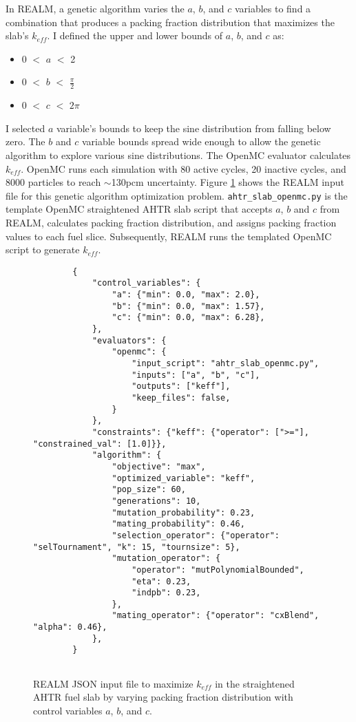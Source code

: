 In \gls{REALM}, a genetic algorithm varies the $a$, $b$, and $c$ variables to 
find a combination that produces a packing fraction distribution that maximizes 
the slab's $k_{eff}$. 
I defined the upper and lower bounds of $a$, $b$, and $c$ as: 
\begin{itemize}
    \item 0 $<$ $a$ $<$ 2 
    \item 0 $<$ $b$ $<$ $\frac{\pi}{2}$
    \item 0 $<$ $c$ $<$ $2\pi$
\end{itemize}
I selected $a$ variable's bounds to keep the sine distribution from falling 
below zero. 
The $b$ and $c$ variable bounds spread wide enough to allow the genetic 
algorithm to explore various sine distributions. 
The OpenMC evaluator calculates $k_{eff}$. 
OpenMC runs each simulation with 80 active cycles, 20 inactive cycles, and 
8000 particles to reach $\sim$130pcm uncertainty. 
Figure \ref{fig:realm-input-simple} shows the \gls{REALM} input file for this 
genetic algorithm optimization problem. 
\texttt{ahtr\_slab\_openmc.py} is the template OpenMC straightened \gls{AHTR} 
slab script that accepts $a$, $b$ and $c$ from \gls{REALM}, calculates packing 
fraction distribution, and assigns packing fraction values to each fuel slice. 
Subsequently, \gls{REALM} runs the templated OpenMC script to generate $k_{eff}$. 
\begin{figure}[]
    \begin{verbatim}
        {
            "control_variables": {
                "a": {"min": 0.0, "max": 2.0},
                "b": {"min": 0.0, "max": 1.57},
                "c": {"min": 0.0, "max": 6.28},
            },
            "evaluators": {
                "openmc": {
                    "input_script": "ahtr_slab_openmc.py",
                    "inputs": ["a", "b", "c"],
                    "outputs": ["keff"],
                    "keep_files": false,
                }
            },
            "constraints": {"keff": {"operator": [">="], "constrained_val": [1.0]}},
            "algorithm": {
                "objective": "max",
                "optimized_variable": "keff",
                "pop_size": 60,
                "generations": 10,
                "mutation_probability": 0.23,
                "mating_probability": 0.46,
                "selection_operator": {"operator": "selTournament", "k": 15, "tournsize": 5},
                "mutation_operator": {
                    "operator": "mutPolynomialBounded",
                    "eta": 0.23,
                    "indpb": 0.23,
                },
                "mating_operator": {"operator": "cxBlend", "alpha": 0.46},
            },
        }
        
    \end{verbatim}
    \caption{\acrfull{REALM} JSON input file to maximize $k_{eff}$ in the 
    straightened \acrfull{AHTR} fuel slab by varying packing fraction distribution 
    with control variables $a$, $b$, and $c$.}
    \label{fig:realm-input-simple}
\end{figure}

